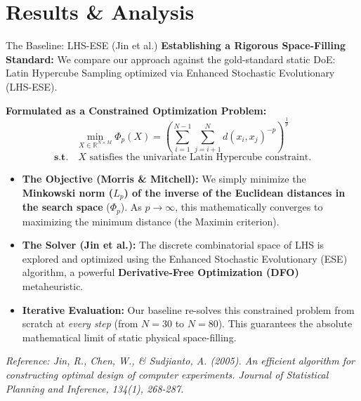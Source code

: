 \documentclass[10pt, aspectratio=169]{beamer}
\begin{document}
\section{Results \& Analysis}

\begin{frame}[fragile]{The Baseline: LHS-ESE (Jin et al.)}
  \textbf{Establishing a Rigorous Space-Filling Standard:}
  We compare our approach against the gold-standard static DoE: Latin Hypercube Sampling optimized via Enhanced Stochastic Evolutionary (LHS-ESE).
  
  \vspace{0.2cm}
  \textbf{Formulated as a Constrained Optimization Problem:}
  $$ \min_{X \in \mathbb{R}^{N \times M}} \Phi_p(X) = \left( \sum_{i=1}^{N-1} \sum_{j=i+1}^N d(x_i, x_j)^{-p} \right)^{\frac{1}{p}} $$
  $$ \textbf{s.t.} \quad X \text{ satisfies the univariate Latin Hypercube constraint.} $$
  
  \begin{itemize}
      \item \textbf{The Objective (Morris \& Mitchell):} We simply minimize the \textbf{Minkowski norm ($L_p$) of the inverse of the Euclidean distances in the search space} ($\Phi_p$). As $p \to \infty$, this mathematically converges to maximizing the minimum distance (the Maximin criterion).
      \item \textbf{The Solver (Jin et al.):} The discrete combinatorial space of LHS is explored and optimized using the Enhanced Stochastic Evolutionary (ESE) algorithm, a powerful \textbf{Derivative-Free Optimization (DFO)} metaheuristic.
      \item \textbf{Iterative Evaluation:} Our baseline re-solves this constrained problem from scratch at \textit{every step} (from $N=30$ to $N=80$). This guarantees the absolute mathematical limit of static physical space-filling.
  \end{itemize}
  
  \vspace{0.3cm}
  \footnotesize{\textit{Reference: Jin, R., Chen, W., \& Sudjianto, A. (2005). An efficient algorithm for constructing optimal design of computer experiments. Journal of Statistical Planning and Inference, 134(1), 268-287.}}
\end{frame}
\end{document}
